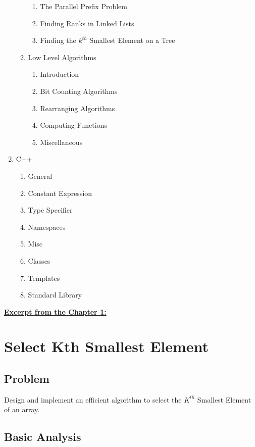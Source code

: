 \begin{enumerate}[label=\Roman*]
\begin{enumerate}[label=\arabic*.]
\begin{enumerate}[label*=\arabic*.]
              \item The Parallel Prefix Problem
              \item Finding Ranks in Linked Lists
              \item Finding the $k^{th}$ Smallest Element on a Tree
            \end{enumerate}    
        \item Low Level Algorithms
          \begin{enumerate}[label*=\arabic*.]
              \item Introduction
              \item Bit Counting Algorithms
              \item Rearranging Algorithms
              \item Computing Functions
              \item Miscellaneous
            \end{enumerate}    
        \end{enumerate}    
\item C++
    \begin{enumerate}[label=\arabic*]
      \item General
      \item Constant Expression
      \item Type Specifier
      \item Namespaces
      \item Misc
      \item Classes
      \item Templates
      \item Standard Library
    \end{enumerate}   
\end{enumerate} 

    

\hrulefill

\underline{\textbf{\textcolor{BurntOrange}{Excerpt from the Chapter} \textcolor{Sepia}{1:}}}

\section{Select Kth Smallest Element}
\subsection*{Problem}
Design and implement an efficient algorithm to select the $K^{th}$ Smallest Element of an array.
\subsection*{Basic Analysis}
